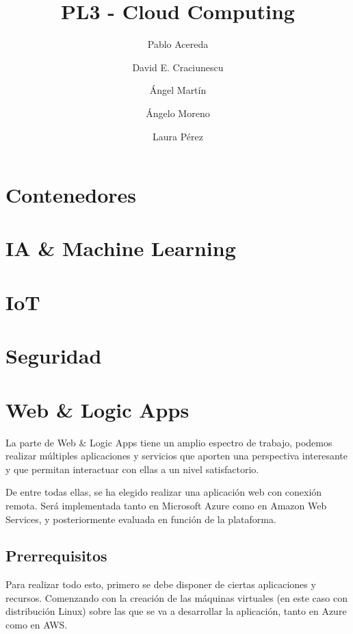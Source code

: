 \documentclass[10pt]{article}
\begin{document}
\title{PL3 - Cloud Computing}

\author{Pablo Acereda \and
David E. Craciunescu \and
Ángel Martín \and
Ángelo Moreno \and
Laura Pérez
}


\maketitle

\section{Contenedores}

\section{IA \& Machine Learning}

\section{IoT}

\section{Seguridad}

\section{Web \& Logic Apps}

La parte de Web \& Logic Apps tiene un amplio espectro de trabajo, podemos realizar
múltiples aplicaciones y servicios que aporten una perspectiva interesante y que
permitan interactuar con ellas a un nivel satisfactorio.

De entre todas ellas, se ha elegido realizar una aplicación web con conexión remota.
Será implementada tanto en Microsoft Azure como en Amazon Web Services, y
posteriormente evaluada en función de la plataforma.

\subsection{Prerrequisitos}

Para realizar todo esto, primero se debe disponer de ciertas aplicaciones y
recursos. Comenzando con la creación de las máquinas virtuales (en este caso con
distribución Linux) sobre las que se va a desarrollar la aplicación, tanto en Azure
como en AWS.
\end{document}
